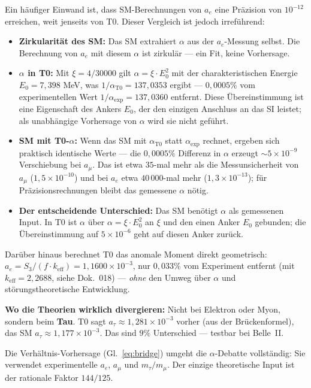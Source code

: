 Ein häufiger Einwand ist, dass SM-Berechnungen von $a_e$ eine Präzision von $10^{-12}$ erreichen, weit jenseits von T0. Dieser Vergleich ist jedoch irreführend:

\begin{itemize}
	\item \textbf{Zirkularität des SM:} Das SM extrahiert $\alpha$ aus der $a_e$-Messung selbst. Die Berechnung von $a_e$ mit diesem $\alpha$ ist zirkulär — ein Fit, keine Vorhersage.
	\item \textbf{$\alpha$ in T0:} Mit $\xi = 4/30000$ gilt $\alpha = \xi \cdot E_0^2$ mit der charakteristischen Energie $E_0 = 7{,}398$ MeV, was $1/\alpha_\text{T0} = 137{,}0353$ ergibt — $0{,}0005\%$ vom experimentellen Wert $1/\alpha_\text{exp} = 137{,}0360$ entfernt. Diese Übereinstimmung ist eine Eigenschaft des Ankers $E_0$, der den einzigen Anschluss an das SI leistet; als unabhängige Vorhersage von $\alpha$ wird sie nicht geführt.
	\item \textbf{SM mit T0-$\alpha$:} Wenn das SM mit $\alpha_\text{T0}$ statt $\alpha_\text{exp}$ rechnet, ergeben sich praktisch identische Werte — die $0{,}0005\%$ Differenz in $\alpha$ erzeugt $\sim 5 \times 10^{-9}$ Verschiebung bei $a_\mu$. Das ist etwa $35$-mal mehr als die Messunsicherheit von $a_\mu$ ($1{,}5\times10^{-10}$) und bei $a_e$ etwa $40\,000$-mal mehr ($1{,}3\times10^{-13}$); für Präzisionsrechnungen bleibt das gemessene $\alpha$ nötig.
	\item \textbf{Der entscheidende Unterschied:} Das SM benötigt $\alpha$ als gemessenen Input. In T0 ist $\alpha$ über $\alpha = \xi \cdot E_0^2$ an $\xi$ und den einen Anker $E_0$ gebunden; die Übereinstimmung auf $5 \times 10^{-6}$ geht auf diesen Anker zurück.
\end{itemize}

Darüber hinaus berechnet T0 das anomale Moment direkt geometrisch: $a_e = S_3/(f \cdot k_\text{eff}) = 1{,}1600 \times 10^{-3}$, nur $0{,}033\%$ vom Experiment entfernt (mit $k_\text{eff} = 2{,}2688$, siehe Dok.~018) — \textit{ohne} den Umweg über $\alpha$ und störungstheoretische Entwicklung.

\textbf{Wo die Theorien wirklich divergieren:} Nicht bei Elektron oder Myon, sondern beim \textbf{Tau}. T0 sagt $a_\tau \approx 1{,}281 \times 10^{-3}$ vorher (aus der Brückenformel), das SM $a_\tau \approx 1{,}177 \times 10^{-3}$. Das sind $9\%$ Unterschied — testbar bei Belle~II.

Die Verhältnis-Vorhersage (Gl.~\ref{eq:bridge}) umgeht die $\alpha$-Debatte vollständig: Sie verwendet experimentelle $a_e$, $a_\mu$ und $m_\tau/m_\mu$. Der einzige theoretische Input ist der rationale Faktor $144/125$.

